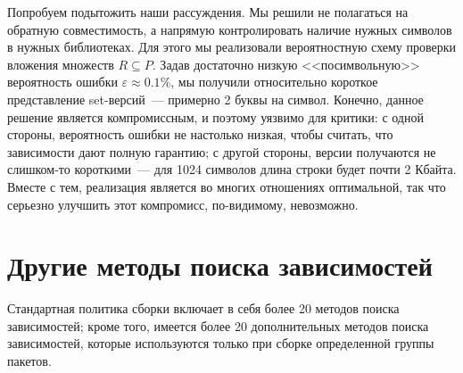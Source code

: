 \documentclass[russian,a4paper,12pt,titlepage]{article}
\begin{document}
Попробуем подытожить наши рассуждения.  Мы решили не полагаться на обратную совместимость, а напрямую контролировать
наличие нужных символов в нужных библиотеках.  Для этого мы реализовали вероятностную схему проверки вложения множеств $R\subseteq P$.
Задав достаточно низкую <<посимвольную>> вероятность ошибки $\varepsilon\approx0.1\%$, мы получили относительно короткое представление
set-версий~--- примерно 2 буквы на символ.  Конечно, данное решение является компромиссным, и поэтому уязвимо для критики:
с одной стороны, вероятность ошибки не настолько низкая, чтобы считать, что зависимости дают полную гарантию; с другой стороны,
версии получаются не слишком-то короткими~--- для 1024 символов длина строки будет почти 2 Кбайта.  Вместе с тем, реализация является
во многих отношениях оптимальной, так что серьезно улучшить этот компромисс, по-видимому, невозможно.

\section{Другие методы поиска зависимостей}
Стандартная политика сборки включает в себя более 20 методов поиска зависимостей;
кроме того, имеется более 20 дополнительных методов поиска зависимостей, которые используются
только при сборке определенной группы пакетов.
\end{document}
